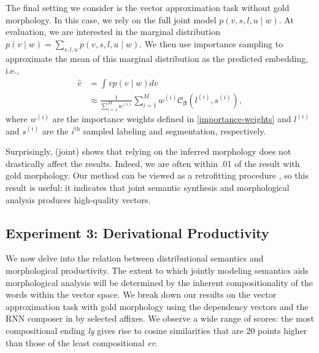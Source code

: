 \documentclass[11pt,letterpaper]{article}
\newcommand{\word}[1]{{\em #1}}
\newcommand{\CC}{\mathcal{C}_{\vbeta}}
\renewcommand{\vec}{\boldsymbol}
\newcommand{\vbeta}{{\vec{\beta}}}
\begin{document}
The final setting we consider is the vector approximation task without gold
morphology. In this case,  we rely on the full joint model $p(v, s, l, u \mid w)$.
At evaluation, we are interested in the marginal distribution $p(v \mid w) = \sum_{s, l, u}p(v, s, l, u \mid w)$.
We then use importance sampling to approximate the mean of this marginal distribution as the predicted embedding, i.e., 
\begin{align}
  \hat{v} &= \int v p(v \mid w) dv \\
  &\approx \frac{1}{\sum_{i=1}^M w^{(i)}}\sum_{i=1}^M
  w^{(i)} \CC(l^{(i)}, s^{(i)}), 
\end{align}
where $w^{(i)}$ are the importance weights defined in
\eqref{importance-weights} and $l^{(i)}$ and $s^{(i)}$ are the
$i^{\text{th}}$ sampled labeling and segmentation, respectively.

%
%
%
%
%

Surprisingly,  (joint) shows that relying on the inferred morphology does not
drastically affect the results. Indeed, we are often within .01
of the result with gold morphology.
Our method can be viewed as a retrofitting procedure
\cite{faruqui2015retrofitting}, so this result is useful: it indicates that 
joint semantic synthesis and morphological analysis produces
high-quality vectors.



\subsection{Experiment 3: Derivational Productivity}
We now delve into the relation between distributional
semantics and morphological productivity. The extent to which
jointly modeling semantics aids morphological analysis will
be determined by the inherent compositionality of the
words within the vector space. We break down our results on the vector approximation
task with gold morphology using the dependency vectors and the RNN composer in
 by selected affixes. 
We observe
a wide range of scores: the
most compositional ending \word{ly} gives rise to cosine
similarities that are  20 points higher than those of the
least compositional \word{er}.

\end{document}
